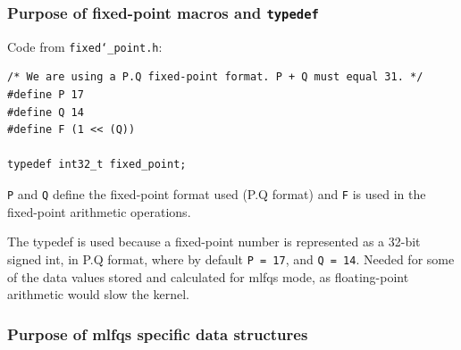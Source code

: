 \documentclass{article}
\renewcommand{\_}{\char`_}
\begin{document}
\subsubsection{Purpose of fixed-point macros and \texttt{typedef}}

Code from \texttt{fixed\_point.h}: 

\begin{lstlisting}
/* We are using a P.Q fixed-point format. P + Q must equal 31. */
#define P 17
#define Q 14
#define F (1 << (Q))

typedef int32_t fixed_point;

\end{lstlisting}

\texttt{P} and \texttt{Q} define the fixed-point format used (P.Q format) and \texttt{F} is used in the fixed-point arithmetic operations.

The typedef is used because a fixed-point number is represented as a 32-bit signed int, in P.Q format, where by default \texttt{P = 17}, and \texttt{Q = 14}. Needed for some of the data values stored and calculated for mlfqs mode, as floating-point arithmetic would slow the kernel.

\subsubsection{Purpose of mlfqs specific data structures}
\end{document}
